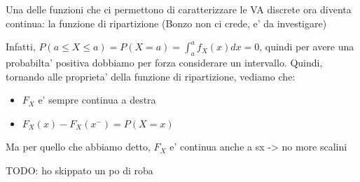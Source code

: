 


Una delle funzioni che ci permettono di caratterizzare le VA discrete ora diventa continua: la funzione di ripartizione (Bonzo non ci crede, e' da investigare)

Infatti, $ P(a \leq X \leq a) = P(X = a) = \int_{a}^{a}f_X(x)dx = 0 $, quindi per avere una probabilta' positiva dobbiamo per forza considerare un intervallo. Quindi, tornando alle proprieta' della funzione di ripartizione, vediamo che:
\begin{itemize}
\item $ F_X $ e' sempre continua a destra
\item $ F_X(x) - F_X(x^{-}) = P(X = x) $
\end{itemize}

Ma per quello che abbiamo detto, $ F_X $ e' continua anche a sx -> no more scalini


TODO: ho skippato un po di roba



